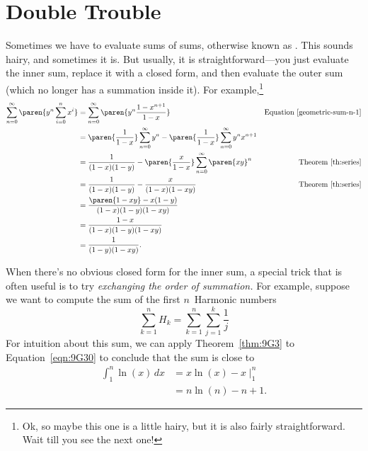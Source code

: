 \section{Double Trouble}

Sometimes we have to evaluate sums of sums, otherwise known as
.  This sounds hairy, and sometimes it is.
But usually, it is straightforward---you just evaluate the inner sum,
replace it with a closed form, and then evaluate the outer sum (which
no longer has a summation inside it).  For example,\footnote{Ok, so
  maybe this one is a little hairy, but it is also fairly
  straightforward.  Wait till you see the next one!}
\begingroup
{}
\begin{align*}
\sum_{n=0}^{\infty} \paren{y^n \sum_{i=0}^n x^i}
 & = \sum_{n=0}^{\infty} \paren{y^n \frac{1-x^{n+1}}{1-x}}
     & \text{Equation~\ref{geometric-sum-n-1}}\\
%
 & = \paren{\frac{1}{1-x}} \sum_{n=0}^{\infty} y^n
     - \paren{\frac{1}{1-x}} \sum_{n=0}^{\infty} y^nx^{n+1} \\
%
 & = \frac{1}{(1-x)(1-y)}
    - \paren{\frac{x}{1 - x}} \sum_{n=0}^{\infty} \paren{xy}^n
      & \text{Theorem~\ref{th:series}}\\
%
 & = \frac{1}{(1-x)(1-y)} - \frac{x}{(1-x)(1-xy)}
      & \text{Theorem~\ref{th:series}}\\
%
  & = \frac{\paren{1-xy} - x(1-y)}{(1-x)(1-y)(1-xy)}\\
%
  & = \frac{1-x}{(1-x)(1-y)(1-xy)}\\
%
  & = \frac{1}{(1-y)(1-xy)}.
\end{align*}
\endgroup

When there's no obvious closed form for the inner sum, a special trick
that is often useful is to try \emph{exchanging the order of
  summation.}  For example, suppose we want to compute the sum of the
first $n$~Harmonic numbers
\begin{equation}\label{eqn:9B}
    \sum_{k=1}^n H_k = \sum_{k=1}^n \sum_{j=1}^k \frac{1}{j}
\end{equation}
For intuition about this sum, we can apply Theorem~\ref{thm:9G3} to
Equation~\ref{eqn:9G30} to conclude that the sum is close to
\begin{align*}
\int_{1}^n \ln(x) \, dx
    &=  x \ln(x) - x \; \Bigr|_1^n \\
    &= n \ln(n) - n + 1.
\end{align*}

